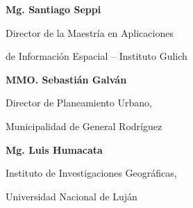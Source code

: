 


\textbf{Mg. Santiago Seppi}

Director de la Maestría en Aplicaciones

de Información Espacial – Instituto Gulich


\textbf{MMO. Sebastián Galván}

Director de Planeamiento Urbano,

Municipalidad de General Rodríguez


\textbf{Mg. Luis Humacata}

Instituto de Investigaciones Geográficas, 

Universidad Nacional de Luján



